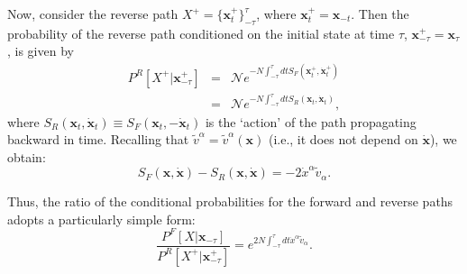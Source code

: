 \documentclass[9pt,twocolumn,twoside]{gsajnl}
\begin{document}
Now, consider the reverse path $X^+ = \{ \mathbf{x}^+_t \}_{-\tau}^{\tau}$, where $\mathbf{x}^+_t = \mathbf{x}_{-t}$. Then the probability of the reverse path conditioned on the initial state at time $\tau$,
$\mathbf{x}^+_{-\tau} = \mathbf{x}_{\tau}$, is given by
\begin{eqnarray} \label{Path:eq:2}
P^R [X^+ | \mathbf{x}^+_{-\tau}] &=& \mathcal{N} e^{-N \int_{-\tau}^{\tau} dt S_F (\mathbf{x}^+_t, \dot{\mathbf{x}}^+_t)} \\
&=& \mathcal{N} e^{-N \int_{-\tau}^{\tau} dt S_R (\mathbf{x}_t, \dot{\mathbf{x}}_t)}, \nonumber
\end{eqnarray}
where $S_R (\mathbf{x}_t, \dot{\mathbf{x}}_t) \equiv S_F (\mathbf{x}_t, -\dot{\mathbf{x}}_t)$ is the `action' of the path propagating backward in time.
Recalling that $\widetilde{v}^\alpha =  \widetilde{v}^\alpha (\mathbf{x})$ (i.e., it does not depend on $\dot{\mathbf{x}}$), we obtain:
\begin{equation} \label{SF:SR:diff:eq}
S_F (\mathbf{x}, \dot{\mathbf{x}}) - S_R (\mathbf{x}, \dot{\mathbf{x}}) = -2 \dot{x}^\alpha \widetilde{v}_\alpha.
\end{equation}

Thus, the ratio of the conditional probabilities for the forward and reverse paths adopts a particularly simple form:
\begin{equation} \label{PF:PR:cond:eq}
\frac{P^F [X | \mathbf{x}_{-\tau}]}{P^R [X^+ | \mathbf{x}^+_{-\tau}]} = e^{2 N  \int_{-\tau}^{\tau} dt \dot{x}^\alpha \widetilde{v}_\alpha}.
\end{equation}
\end{document}
